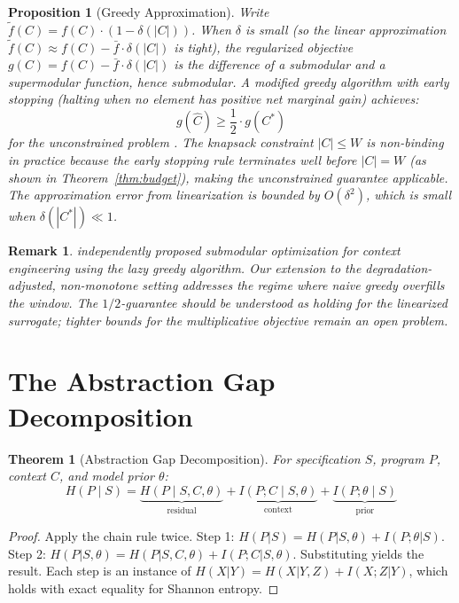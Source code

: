 \documentclass[11pt, a4paper, copyright]{googledeepmind}
\newtheorem{theorem}{Theorem}[section]
\newtheorem{proposition}{Proposition}[section]
\newtheorem*{remark}{Remark}
\begin{document}
\begin{proposition}[Greedy Approximation]
\label{thm:greedy}
Write $\tilde{f}(C) = f(C) \cdot (1 - \delta(|C|))$. When $\delta$ is small (so the linear approximation $\tilde{f}(C) \approx f(C) - \bar{f} \cdot \delta(|C|)$ is tight), the regularized objective $g(C) = f(C) - \bar{f} \cdot \delta(|C|)$ is the difference of a submodular and a supermodular function, hence submodular. A modified greedy algorithm with early stopping (halting when no element has positive net marginal gain) achieves:
$$g(\hat{C}) \geq \frac{1}{2} \cdot g(C^*)$$
for the unconstrained problem \citep{buchbinder2015tight}. The knapsack constraint $|C| \leq W$ is non-binding in practice because the early stopping rule terminates well before $|C| = W$ (as shown in Theorem~\ref{thm:budget}), making the unconstrained guarantee applicable. The approximation error from linearization is bounded by $O(\delta^2)$, which is small when $\delta(|C^*|) \ll 1$.
\end{proposition}

\begin{remark}
\citet{jina2025submodular} independently proposed submodular optimization for context engineering using the lazy greedy algorithm. Our extension to the degradation-adjusted, non-monotone setting addresses the regime where naive greedy overfills the window. The $1/2$-guarantee should be understood as holding for the linearized surrogate; tighter bounds for the multiplicative objective remain an open problem.
\end{remark}


\section{The Abstraction Gap Decomposition}
\label{sec:abstraction-gap}

\begin{theorem}[Abstraction Gap Decomposition]
\label{thm:decomposition}
For specification $S$, program $P$, context $C$, and model prior $\theta$:
$$H(P \mid S) = \underbrace{H(P \mid S, C, \theta)}_{\text{residual}} + \underbrace{I(P; C \mid S, \theta)}_{\text{context}} + \underbrace{I(P; \theta \mid S)}_{\text{prior}}$$
\end{theorem}

\begin{proof}
Apply the chain rule twice. Step 1: $H(P|S) = H(P|S,\theta) + I(P;\theta|S)$. Step 2: $H(P|S,\theta) = H(P|S,C,\theta) + I(P;C|S,\theta)$. Substituting yields the result. Each step is an instance of $H(X|Y) = H(X|Y,Z) + I(X;Z|Y)$, which holds with exact equality for Shannon entropy.
\end{proof}
\end{document}
